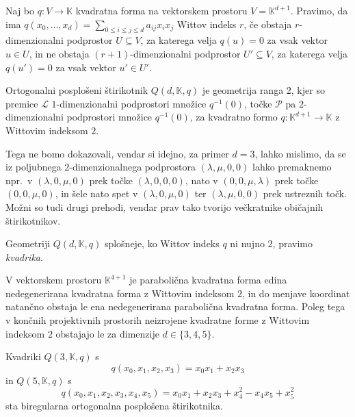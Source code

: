 \documentclass[fin1, tisk]{fmfdelo}
\newcommand{\PP}{\mathcal{P}}
\newcommand{\LL}{\mathcal{L}}
\begin{document}
\begin{definicija}
    Naj bo $q: V \to \mathbb{K}$ kvadratna forma na vektorskem prostoru $V=\mathbb{K}^{d+1}$. 
    Pravimo, da ima $q(x_0, \ldots, x_d) = \sum_{0\leq i \leq j \leq d} a_{ij}x_i x_j$ Wittov
    indeks $r$, če obstaja $r$-dimenzionalni podprostor $U\subseteq V$, za katerega velja $q(u) = 0$ za vsak vektor $u\in U$,
    in ne obstaja $(r+1)$-dimenzionalni podprostor $U'\subseteq V$, za katerega velja $q(u') = 0$ za vsak vektor $u'\in U'$.
\end{definicija}

\begin{definicija}
    Ortogonalni posplošeni štirikotnik $Q(d, \mathbb{K}, q)$ je geometrija ranga $2$, kjer so
    premice $\LL$ $1$-dimenzionalni podprostori množice $q^{-1}(0)$, točke $\PP$ pa $2$-dimenzionalni podprostori množice $q^{-1}(0)$,
    za kvadratno formo $q: \mathbb{K}^{d+1} \to \mathbb{K}$ z Wittovim indeksom $2$.
\end{definicija}

\begin{opomba}
    Tega ne bomo dokazovali, vendar si idejno, za primer $d=3$, lahko mislimo,
    da se iz poljubnega $2$-dimenzionalnega podprostora $(\lambda, \mu, 0, 0)$
    lahko pre\-mak\-ne\-mo npr.~v $(\lambda, 0, \mu, 0)$ prek točke $(\lambda, 0, 0, 0)$,
    nato v $(0, 0, \mu, \lambda)$ prek točke $(0, 0, \mu, 0)$, in šele nato spet
    v $(\lambda, 0, \mu, 0)$ ter $(\lambda, \mu, 0, 0)$ prek ustreznih točk.
    Možni so tudi drugi prehodi, vendar prav tako tvorijo večkratnike običajnih
    štirikotnikov.
\end{opomba}

\begin{opomba}
    Geometriji $Q(d, \mathbb{K}, q)$ splošneje, ko Wittov indeks $q$ ni nujno $2$, pravimo \emph{kvadrika}.
\end{opomba}

\begin{opomba}
    V vektorskem prostoru $\mathbb{K}^{4+1}$ je parabolična kvadratna forma edina nedegenerirana kvadratna forma z Wittovim indeksom $2$,
    in do menjave koordinat natančno obstaja le ena nedegenerirana parabolična kvadratna forma. Poleg tega
    v končnih projektivnih prostorih neizrojene kvadratne forme z Wittovim indeksom $2$ obstajajo le za dimenzije $d\in\{3,4,5\}$.
\end{opomba}

\begin{zgled}
    Kvadriki $Q(3, \mathbb{K}, q)$ s $$q(x_0, x_1, x_2, x_3) = x_0x_1 + x_2x_3$$ in $Q(5, \mathbb{K}, q)$ s 
    $$q(x_0, x_1, x_2, x_3, x_4, x_5) = x_0x_1 + x_2x_3 + x_4^2 - x_4x_5 + x_5^2$$ sta biregularna ortogonalna posplošena štirikotnika.
\end{zgled}
\end{document}
